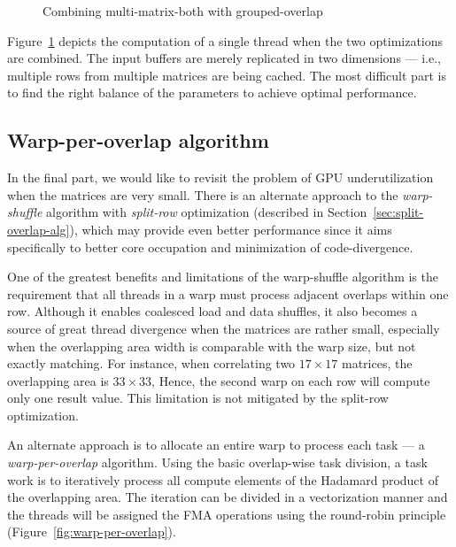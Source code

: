 \begin{figure}[ht]
	\centering
	\def\svgwidth{0.8\textwidth}
	\fontsize{9}{12}\selectfont
	
	\caption{Combining multi-matrix-both with grouped-overlap}
	\label{fig:warpshuffle-combined}
\end{figure}

Figure~\ref{fig:warpshuffle-combined} depicts the computation of a single thread when the two optimizations are combined. The input buffers are merely replicated in two dimensions --- i.e., multiple rows from multiple matrices are being cached. The most difficult part is to find the right balance of the parameters to achieve optimal performance.


\subsection{Warp-per-overlap algorithm}\label{sec:warp-per-overlap}

In the final part, we would like to revisit the problem of GPU underutilization when the matrices are very small. There is an alternate approach to the \emph{warp-shuffle} algorithm with \emph{split-row} optimization (described in Section~\ref{sec:split-overlap-alg}), which may provide even better performance since it aims specifically to better core occupation and minimization of code-divergence.

One of the greatest benefits and limitations of the warp-shuffle algorithm is the requirement that all threads in a warp must process adjacent overlaps within one row. Although it enables coalesced load and data shuffles, it also becomes a source of great thread divergence when the matrices are rather small, especially when the overlapping area width is comparable with the warp size, but not exactly matching. For instance, when correlating two $17\times 17$ matrices, the overlapping area is $33\times 33$, Hence, the second warp on each row will compute only one result value. This limitation is not mitigated by the split-row optimization.

An alternate approach is to allocate an entire warp to process each task --- a \emph{warp-per-overlap} algorithm. Using the basic overlap-wise task division, a task work is to iteratively process all compute elements of the Hadamard product of the overlapping area. The iteration can be divided in a vectorization manner and the threads will be assigned the FMA operations using the round-robin principle (Figure~\ref{fig:warp-per-overlap}).
 
